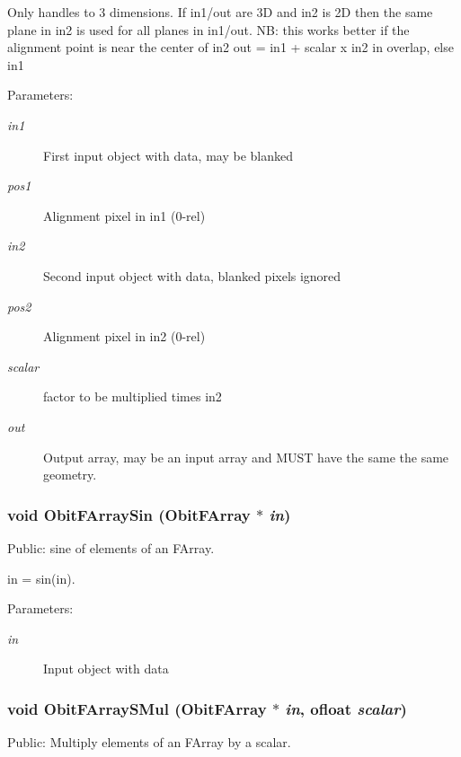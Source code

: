 Only handles to 3 dimensions. If in1/out are 3D and in2 is 2D then the same plane in in2 is used for all planes in in1/out. NB: this works better if the alignment point is near the center of in2 out = in1 + scalar x in2 in overlap, else in1 \begin{Desc}
\item[Parameters:]
\begin{description}
\item[{\em in1}]First input object with data, may be blanked \item[{\em pos1}]Alignment pixel in in1 (0-rel) \item[{\em in2}]Second input object with data, blanked pixels ignored \item[{\em pos2}]Alignment pixel in in2 (0-rel) \item[{\em scalar}]factor to be multiplied times in2 \item[{\em out}]Output array, may be an input array and MUST have the same the same geometry. \end{description}
\end{Desc}
\subsubsection{\setlength{\rightskip}{0pt plus 5cm}void Obit\-FArray\-Sin ({\bf Obit\-FArray} $\ast$ {\em in})}\label{ObitFArray_8c_a37}


Public: sine of elements of an FArray. 

in = sin(in). \begin{Desc}
\item[Parameters:]
\begin{description}
\item[{\em in}]Input object with data \end{description}
\end{Desc}
\subsubsection{\setlength{\rightskip}{0pt plus 5cm}void Obit\-FArray\-SMul ({\bf Obit\-FArray} $\ast$ {\em in}, {\bf ofloat} {\em scalar})}\label{ObitFArray_8c_a43}


Public: Multiply elements of an FArray by a scalar. 

